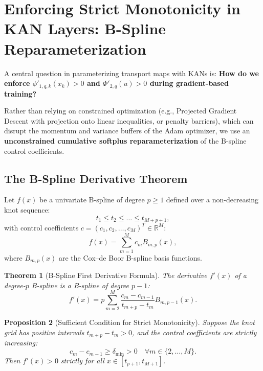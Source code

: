 \documentclass[11pt,a4paper]{article}
\theoremstyle{plain}
\newtheorem{theorem}{Theorem}[section]
\newtheorem{proposition}[theorem]{Proposition}
\theoremstyle{definition}
\theoremstyle{remark}
\begin{document}
\section{Enforcing Strict Monotonicity in KAN Layers: B-Spline Reparameterization}

A central question in parameterizing transport maps with KANs is: \textbf{How do we enforce $\phi'_{1, q, k}(x_k) > 0$ and $\Phi'_{2, q}(u) > 0$ during gradient-based training?} 

Rather than relying on constrained optimization (e.g., Projected Gradient Descent with projection onto linear inequalities, or penalty barriers), which can disrupt the momentum and variance buffers of the Adam optimizer, we use an \textbf{unconstrained cumulative softplus reparameterization} of the B-spline control coefficients.

\subsection{The B-Spline Derivative Theorem}

Let $f(x)$ be a univariate B-spline of degree $p \ge 1$ defined over a non-decreasing knot sequence:
\begin{equation}
    t_1 \le t_2 \le \dots \le t_{M+p+1},
\end{equation}
with control coefficients $c = (c_1, c_2, \dots, c_M)^T \in \mathbb{R}^M$:
\begin{equation}
    f(x) = \sum_{m=1}^M c_m B_{m, p}(x),
\end{equation}
where $B_{m, p}(x)$ are the Cox--de Boor B-spline basis functions.

\begin{theorem}[B-Spline First Derivative Formula]
The derivative $f'(x)$ of a degree-$p$ B-spline is a B-spline of degree $p-1$:
\begin{equation}
    f'(x) = p \sum_{m=2}^M \frac{c_m - c_{m-1}}{t_{m+p} - t_m} B_{m, p-1}(x).
    \label{eq:bspline_derivative}
\end{equation}
\end{theorem}

\begin{proposition}[Sufficient Condition for Strict Monotonicity]
\label{prop:bspline_monotonicity}
Suppose the knot grid has positive intervals $t_{m+p} - t_m > 0$, and the control coefficients are strictly increasing:
\begin{equation}
    c_m - c_{m-1} \ge \delta_{\min} > 0 \quad \forall m \in \{2, \dots, M\}.
    \label{eq:coeff_increment_condition}
\end{equation}
Then $f'(x) > 0$ strictly for all $x \in [t_{p+1}, t_{M+1}]$.
\end{proposition}
\end{document}
